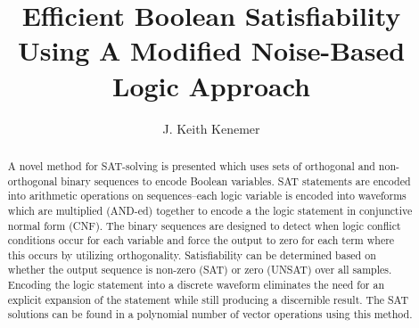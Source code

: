 \documentclass[reqno]{amsart}
\theoremstyle{definition}
\theoremstyle{remark}
\begin{document}

\title{Efficient Boolean Satisfiability Using A Modified Noise-Based Logic Approach }

\author{J. Keith Kenemer}






\begin{abstract}
A novel method for SAT-solving is presented which uses sets of orthogonal and non-orthogonal binary sequences to encode Boolean variables. SAT statements are encoded into arithmetic operations on sequences--each logic variable is encoded into waveforms which are multiplied (AND-ed) together to encode a the logic statement in conjunctive normal form (CNF).  The binary sequences are designed to detect when logic conflict conditions occur for each variable and force the output to zero for each term where this occurs by utilizing orthogonality. Satisfiability can be determined based on whether the output sequence is non-zero (SAT) or zero (UNSAT) over all samples. Encoding the logic statement into a discrete waveform eliminates the need for an explicit expansion of the statement while still producing a discernible result. The SAT solutions can be found in a polynomial number of vector operations using this method.

\end{abstract}

\end{document}
